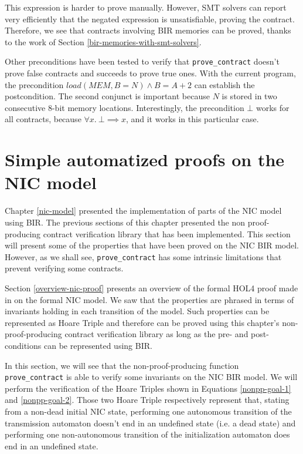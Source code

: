 \documentclass{kththesis}
\begin{document}
{This expression is harder to prove manually. However, SMT solvers can report very efficiently that the negated expression is unsatisfiable, proving the contract. Therefore, we see that contracts involving BIR memories can be proved, thanks to the work of Section \ref{bir-memories-with-smt-solvers}.

Other preconditions have been tested to verify that \texttt{prove\_contract} doesn't prove false contracts and succeeds to prove true ones. With the current program, the precondition $load(MEM,B=N) \land B=A+2$ can establish the postcondition. The second conjunct is important because $N$ is stored in two consecutive 8-bit memory locations. Interestingly, the precondition $\bot$ works for all contracts, because $\forall x.~\bot \implies x$, and it works in this particular case.


\section{Simple automatized proofs on the NIC model} \label{simple-automated-proofs-on-nic}

Chapter \ref{nic-model} presented the implementation of parts of the NIC model using BIR. The previous sections of this chapter presented the non \gls{proof-producing} contract verification library that has been implemented. This section will present some of the properties that have been proved on the NIC BIR model. However, as we shall see, \texttt{prove\_contract} has some intrinsic limitations that prevent verifying some contracts.

Section \ref{overview-nic-proof} presents an overview of the formal HOL4 proof made in \cite{haglund_formal_2016} on the formal NIC model. We saw that the properties are phrased in terms of invariants holding in each transition of the model. Such properties can be represented as Hoare Triple and therefore can be proved using this chapter's non-proof-producing contract verification library as long as the pre- and post-conditions can be represented using BIR.

In this section, we will see that the non-proof-producing function \texttt{prove\_contract} is able to verify some invariants on the NIC BIR model. We will perform the verification of the Hoare Triples shown in Equations \ref{nonpp-goal-1} and \ref{nonpp-goal-2}. Those two Hoare Triple respectively represent that, stating from a non-dead initial NIC state, performing one autonomous transition of the transmission automaton doesn't end in an undefined state (i.e. a dead state) and performing one non-autonomous transition of the initialization automaton does end in an undefined state.

}
\end{document}
